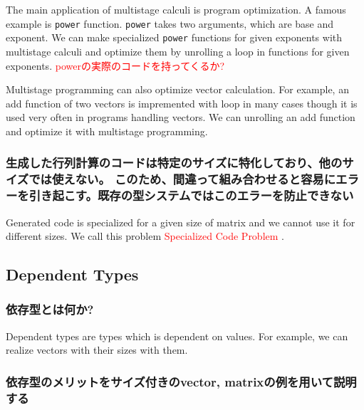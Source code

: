 \documentclass[runningheads]{llncs}
\newcommand{\red}[1]{\textcolor{red}{#1 }}
\begin{document}

The main application of multistage calculi is program optimization.
A famous example is \verb|power| function.
\verb|power| takes two arguments, which are base and exponent.
We can make specialized \verb|power| functions for given exponents with multistage calculi and 
optimize them by unrolling a loop in functions for given exponents.
\red{powerの実際のコードを持ってくるか?}


Multistage programming can also optimize vector calculation.
For example, an add function of two vectors is impremented with loop in many cases
though it is used very often in programs handling vectors.
We can unrolling an add function and optimize it with multistage programming.

\subsubsection{生成した行列計算のコードは特定のサイズに特化しており、他のサイズでは使えない。
このため、間違って組み合わせると容易にエラーを引き起こす。既存の型システムではこのエラーを防止できない}

Generated code is specialized for a given size of matrix and we cannot use it for different sizes.
We call this problem \red{Specialized Code Problem}.

\subsection{Dependent Types}

\subsubsection{依存型とは何か?}

Dependent types are types which is dependent on values.
For example, we can realize vectors with their sizes with them.

\subsubsection{依存型のメリットをサイズ付きのvector, matrixの例を用いて説明する}
\end{document}
